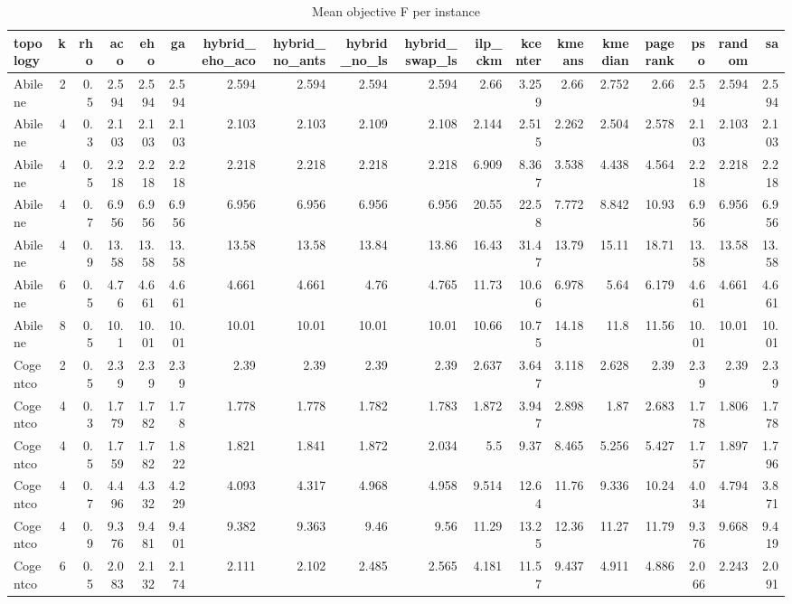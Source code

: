 \begin{table}
\caption{Mean objective F per instance}
\begin{tabular}{lrrrrrrrrrrrrrrrrr}
\toprule
topology & k & rho & aco & eho & ga & hybrid_eho_aco & hybrid_no_ants & hybrid_no_ls & hybrid_swap_ls & ilp_ckm & kcenter & kmeans & kmedian & pagerank & pso & random & sa \\
\midrule
Abilene & 2 & 0.5 & 2.594 & 2.594 & 2.594 & 2.594 & 2.594 & 2.594 & 2.594 & 2.66 & 3.259 & 2.66 & 2.752 & 2.66 & 2.594 & 2.594 & 2.594 \\
Abilene & 4 & 0.3 & 2.103 & 2.103 & 2.103 & 2.103 & 2.103 & 2.109 & 2.108 & 2.144 & 2.515 & 2.262 & 2.504 & 2.578 & 2.103 & 2.103 & 2.103 \\
Abilene & 4 & 0.5 & 2.218 & 2.218 & 2.218 & 2.218 & 2.218 & 2.218 & 2.218 & 6.909 & 8.367 & 3.538 & 4.438 & 4.564 & 2.218 & 2.218 & 2.218 \\
Abilene & 4 & 0.7 & 6.956 & 6.956 & 6.956 & 6.956 & 6.956 & 6.956 & 6.956 & 20.55 & 22.58 & 7.772 & 8.842 & 10.93 & 6.956 & 6.956 & 6.956 \\
Abilene & 4 & 0.9 & 13.58 & 13.58 & 13.58 & 13.58 & 13.58 & 13.84 & 13.86 & 16.43 & 31.47 & 13.79 & 15.11 & 18.71 & 13.58 & 13.58 & 13.58 \\
Abilene & 6 & 0.5 & 4.76 & 4.661 & 4.661 & 4.661 & 4.661 & 4.76 & 4.765 & 11.73 & 10.66 & 6.978 & 5.64 & 6.179 & 4.661 & 4.661 & 4.661 \\
Abilene & 8 & 0.5 & 10.1 & 10.01 & 10.01 & 10.01 & 10.01 & 10.01 & 10.01 & 10.66 & 10.75 & 14.18 & 11.8 & 11.56 & 10.01 & 10.01 & 10.01 \\
Cogentco & 2 & 0.5 & 2.39 & 2.39 & 2.39 & 2.39 & 2.39 & 2.39 & 2.39 & 2.637 & 3.647 & 3.118 & 2.628 & 2.39 & 2.39 & 2.39 & 2.39 \\
Cogentco & 4 & 0.3 & 1.779 & 1.782 & 1.78 & 1.778 & 1.778 & 1.782 & 1.783 & 1.872 & 3.947 & 2.898 & 1.87 & 2.683 & 1.778 & 1.806 & 1.778 \\
Cogentco & 4 & 0.5 & 1.759 & 1.782 & 1.822 & 1.821 & 1.841 & 1.872 & 2.034 & 5.5 & 9.37 & 8.465 & 5.256 & 5.427 & 1.757 & 1.897 & 1.796 \\
Cogentco & 4 & 0.7 & 4.496 & 4.332 & 4.229 & 4.093 & 4.317 & 4.968 & 4.958 & 9.514 & 12.64 & 11.76 & 9.336 & 10.24 & 4.034 & 4.794 & 3.871 \\
Cogentco & 4 & 0.9 & 9.376 & 9.481 & 9.401 & 9.382 & 9.363 & 9.46 & 9.56 & 11.29 & 13.25 & 12.36 & 11.27 & 11.79 & 9.376 & 9.668 & 9.419 \\
Cogentco & 6 & 0.5 & 2.083 & 2.132 & 2.174 & 2.111 & 2.102 & 2.485 & 2.565 & 4.181 & 11.57 & 9.437 & 4.911 & 4.886 & 2.066 & 2.243 & 2.091 \\

\end{tabular}
\end{table}
